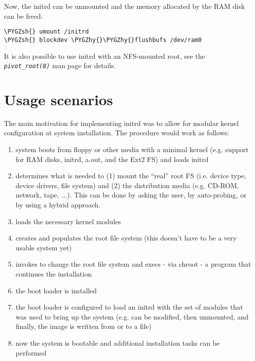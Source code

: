 \documentclass[a4paper,8pt,english]{sphinxmanual}
\def\PYGZsh{\char`\#}
\def\PYGZhy{\char`\-}
\begin{document}
Now, the initrd can be unmounted and the memory allocated by the RAM
disk can be freed:

\begin{Verbatim}[commandchars=\\\{\}]
\PYGZsh{} umount /initrd
\PYGZsh{} blockdev \PYGZhy{}\PYGZhy{}flushbufs /dev/ram0
\end{Verbatim}

It is also possible to use initrd with an NFS-mounted root, see the
\emph{\texttt{pivot\_root(8)}} man page for details.


\section{Usage scenarios}
\label{admin-guide/initrd:usage-scenarios}
The main motivation for implementing initrd was to allow for modular
kernel configuration at system installation. The procedure would work
as follows:
\begin{enumerate}
\item {} 
system boots from floppy or other media with a minimal kernel
(e.g. support for RAM disks, initrd, a.out, and the Ext2 FS) and
loads initrd

\item {} 
 determines what is needed to (1) mount the ``real'' root FS
(i.e. device type, device drivers, file system) and (2) the
distribution media (e.g. CD-ROM, network, tape, ...). This can be
done by asking the user, by auto-probing, or by using a hybrid
approach.

\item {} 
 loads the necessary kernel modules

\item {} 
 creates and populates the root file system (this doesn't
have to be a very usable system yet)

\item {} 
 invokes  to change the root file system and
execs - via chroot - a program that continues the installation

\item {} 
the boot loader is installed

\item {} 
the boot loader is configured to load an initrd with the set of
modules that was used to bring up the system (e.g.  can be
modified, then unmounted, and finally, the image is written from
 or  to a file)

\item {} 
now the system is bootable and additional installation tasks can be
performed

\end{enumerate}
\end{document}
